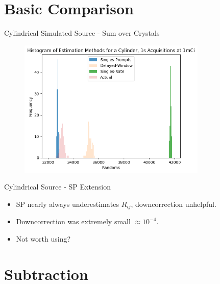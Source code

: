 \documentclass[pdf]{beamer}
\begin{document}
\section{Basic Comparison}

\begin{frame}{Cylindrical Simulated Source - Sum over Crystals}
    \begin{figure}
        \centering
        \includegraphics[width=0.8\textwidth]{figures/hist1mCi.png}
    \end{figure}
\end{frame}

\begin{frame}{Cylindrical Source - SP Extension}
    \begin{itemize}
        \item SP nearly always underestimates $R_{ij}$, downcorrection unhelpful.
        \item Downcorrection was extremely small $\approx 10^{-4}$.
        \item Not worth using?
    \end{itemize}
\end{frame}

\section{Subtraction}
\end{document}
